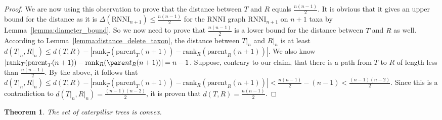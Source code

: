 \documentclass{amsart}
\newcommand{\parent}{\mathrm{parent}}
\newcommand{\rank}{\mathrm{rank}}
\newcommand{\rnni}{\mathrm{RNNI}}
\newtheorem{theorem}[definition]{Theorem}
\begin{document}
\begin{proof}
    We are now using this observation to prove that the distance between $T$ and $R$ equals $\frac{n(n-1)}{2}$.
    It is obvious that it gives an upper bound for the distance as it is $\Delta(\rnni_{n+1}) \leq \frac{n(n-1)}{2}$ for the $\rnni$ graph $\rnni_{n+1}$ on $n+1$ taxa by Lemma~\ref{lemma:diameter_bound}.
    So we now need to prove that $\frac{n(n-1)}{2}$ is a lower bound for the distance between $T$ and $R$ as well.
    According to Lemma~\ref{lemma:distance_delete_taxon}, the distance between $T{\big|}_n$ and $R{\big|}_n$ is at least $d(T{\big|}_n, R{\big|}_n) \leq d(T,R) - |\rank_T(\parent_T(n+1)) - \rank_R(\parent_R(n+1))|$.
    We also know $|\rank_T(\parent_T(n+1)) - \rank_R(\pare nt_R(n+1))| = n-1$.
    Suppose, contrary to our claim, that there is a path from $T$ to $R$ of length less than $\frac{n(n-1)}{2}$.
    By the above, it follows that $d(T{\big|}_n, R{\big|}_n) \leq d(T,R) - |\rank_T(\parent_T(n+1)) - \rank_R(\parent_R(n+1))| < \frac{n(n-1)}{2} - (n-1) < \frac{(n-1)(n-2)}{2}$.
    Since this is a contradiction to $d(T{\big|}_n, R{\big|}_n) = \frac{(n-1)(n-2)}{2}$, it is proven that $d(T,R) = \frac{n(n-1)}{2} $.
\end{proof}

\begin{theorem}
    The set of caterpillar trees is convex.
    \label{thm:caterpillar_convex}
\end{theorem}

\end{document}
